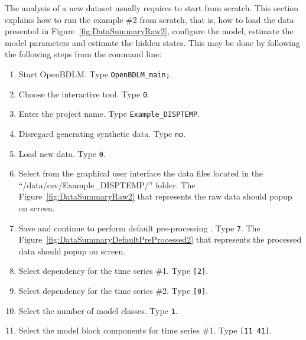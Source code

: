 The analysis of a new dataset usually requires to start from scratch.
This section explains how to run the example \#2 from scratch, that is, how to load the data presented in Figure~\ref{fig:DataSummaryRaw2}, configure the model, estimate the model parameters and estimate the hidden states.
This may be done by following the following steps from the \MATLAB{} command line:
\begin{enumerate}
\item Start OpenBDLM. Type \colorbox{light-gray}{\lstinline[basicstyle = \mlttfamily \small, backgroundcolor = \color{light-gray}]!OpenBDLM_main;!}.
\item Choose the interactive tool. Type \colorbox{light-gray}{\lstinline[basicstyle = \mlttfamily \small, backgroundcolor = \color{light-gray}]!0!}.
\item Enter the project name. Type \colorbox{light-gray}{\lstinline[basicstyle = \mlttfamily \small, backgroundcolor = \color{light-gray}]!Example_DISPTEMP!}. 
\item Disregard generating synthetic data. Type \colorbox{light-gray}{\lstinline[basicstyle = \mlttfamily \small, backgroundcolor = \color{light-gray}]!no!}. 
\item Load new data. Type \colorbox{light-gray}{\lstinline[basicstyle = \mlttfamily \small, backgroundcolor = \color{light-gray}]!0!}.
\item Select from the graphical user interface the data files located in the ``/data/csv/Example\_DISPTEMP/'' folder. The Figure~\ref{fig:DataSummaryRaw2} that represents the raw data should popup on screen.
\item Save and continue to perform default pre-processing . Type \colorbox{light-gray}{\lstinline[basicstyle = \mlttfamily \small, backgroundcolor = \color{light-gray}]!7!}. The Figure~\ref{fig:DataSummaryDefaultPreProcessed2} that represents the processed data should popup on screen.
\item Select dependency for the time series \#1. Type \colorbox{light-gray}{\lstinline[basicstyle = \mlttfamily \small, backgroundcolor = \color{light-gray}]![2]!}.
\item Select dependency for the time series \#2. Type \colorbox{light-gray}{\lstinline[basicstyle = \mlttfamily \small, backgroundcolor = \color{light-gray}]![0]!}.
\item Select the number of model classes. Type \colorbox{light-gray}{\lstinline[basicstyle = \mlttfamily \small, backgroundcolor = \color{light-gray}]!1!}. 
\item Select the model block components for time series \#1. Type \colorbox{light-gray}{\lstinline[basicstyle = \mlttfamily \small, backgroundcolor = \color{light-gray}]![11 41]!}.

\end{enumerate}
